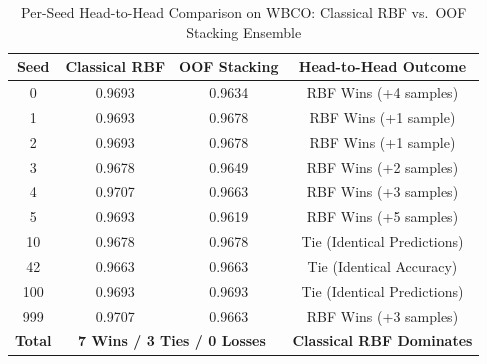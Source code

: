 \documentclass[journal,twocolumn]{IEEEtran}
\begin{document}
\begin{table}[!t]
\caption{Per-Seed Head-to-Head Comparison on WBCO: Classical RBF vs.\ OOF Stacking Ensemble}
\label{tab:wbco_seeds}
\centering
\scriptsize
\setlength{\tabcolsep}{5pt}
\renewcommand{\arraystretch}{1.15}
\begin{tabular}{cccc}
\toprule
\textbf{Seed} & \textbf{Classical RBF} & \textbf{OOF Stacking} & \textbf{Head-to-Head Outcome} \\
\midrule
0   & 0.9693 & 0.9634 & RBF Wins (+4 samples) \\
1   & 0.9693 & 0.9678 & RBF Wins (+1 sample) \\
2   & 0.9693 & 0.9678 & RBF Wins (+1 sample) \\
3   & 0.9678 & 0.9649 & RBF Wins (+2 samples) \\
4   & 0.9707 & 0.9663 & RBF Wins (+3 samples) \\
5   & 0.9693 & 0.9619 & RBF Wins (+5 samples) \\
10  & 0.9678 & 0.9678 & Tie (Identical Predictions) \\
42  & 0.9663 & 0.9663 & Tie (Identical Accuracy) \\
100 & 0.9693 & 0.9693 & Tie (Identical Predictions) \\
999 & 0.9707 & 0.9663 & RBF Wins (+3 samples) \\
\midrule
\textbf{Total} & \multicolumn{2}{c}{\textbf{7 Wins / 3 Ties / 0 Losses}} & \textbf{Classical RBF Dominates} \\
\bottomrule
\end{tabular}
\end{table}
\end{document}
